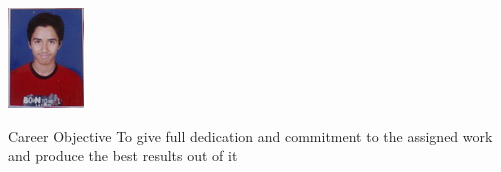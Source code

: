 \documentclass{resume} %
\begin{document}
	\includegraphics{aniket-002}
	
\begin{rSection}{Career Objective}
		To give full dedication and commitment to the assigned work and produce the best results out of it
\end{rSection}
	
\end{document}
